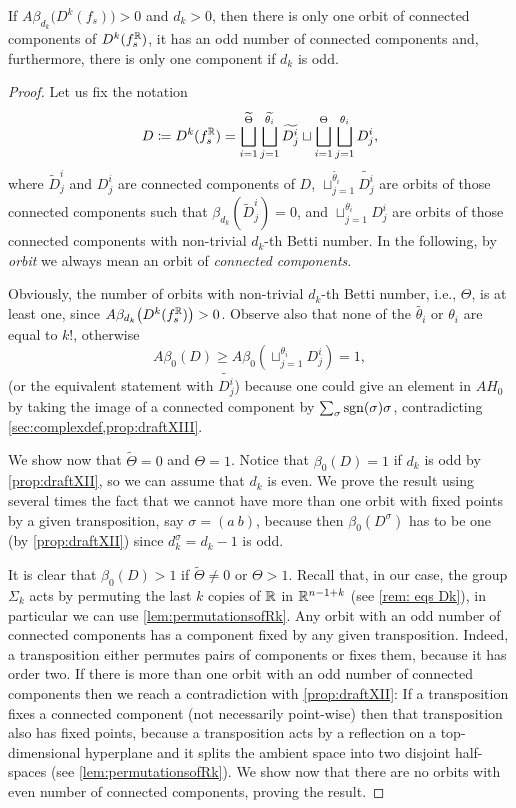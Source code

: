 \documentclass[a4paper,12pt]{amsart}
\begin{document}
\begin{lemma}\label{lem:orbits}
If $A\beta_{d_k}\big(D^k(f_s)\big)>0$ and $d_k>0$, then there is only one orbit of connected components of $D^k(f_s^{\mathbb{R}})$, it has an odd number of connected components and, furthermore, there is only one component if $d_k$ is odd.
\end{lemma}
\begin{proof}
Let us fix the notation
\[ D\coloneqq D^k(f_s^{\mathbb{R}})=\bigsqcup_{i=1}^{\widetilde{\Theta}} \bigsqcup_{j=1}^{\widetilde{\theta_i}} \widetilde{D^i_j} \sqcup \bigsqcup_{i=1}^\Theta \bigsqcup_{j=1}^{\theta_i} D^i_j,\]
where $\widetilde{D}_j^i$ and $D^i_j$ are connected components of $D$, $\sqcup_{j=1}^{\widetilde{\theta_i}} \widetilde{D^i_j}$ are orbits of those connected components such that $\beta_{d_k}(\widetilde{D}_j^i)=0$, and $\sqcup_{j=1}^{\theta_i} D^i_j$ are orbits of those connected components with non-trivial $d_k$-th Betti number. In the following, by \textit{orbit} we always mean an orbit of \emph{connected components}.

Obviously, the number of orbits with non-trivial $d_k$-th Betti number, i.e., $\Theta$, is at least one, since $A\beta_{d_k}\big(D^k(f_s^{\mathbb{R}})\big)>0$. Observe also that none of the $\widetilde{\theta_i}$ or $\theta_i$ are equal to $k!$, otherwise
\[ A\beta_0(D)\geq A\beta_0 \left(\sqcup_{j=1}^{\theta_i} D^i_j\right)=1,\]
(or the equivalent statement with $\widetilde{D^i_j}$) because one could give an element in $AH_0$ by taking the image of a connected component by $\sum_\sigma\operatorname{sgn}(\sigma)\sigma$, contradicting \cref{sec:complexdef,prop:draftXIII}.
\newline

We show now that $\widetilde{\Theta}=0$ and $\Theta=1$. Notice that $\beta_0(D)=1$ if $d_k$ is odd by \cref{prop:draftXII}, so we can assume that $d_k$ is even. We prove the result using several times the fact that we cannot have more than one orbit with fixed points by a given transposition, say $\sigma=(a\ b)$, because then  $\beta_0(D^\sigma)$ has to be one (by \cref{prop:draftXII}) since $d_k^\sigma=d_k-1$ is odd. 


It is clear that $\beta_0(D)>1$ if $\widetilde{\Theta}\neq0$ or $\Theta>1$. Recall that, in our case, the group $\Sigma_k$ acts by permuting the last $k$ copies of  $\mathbb{R}$ in $\mathbb{R}^{n-1+k}$ (see \cref{rem: eqs Dk}), in particular we can use \cref{lem:permutationsofRk}. Any orbit with an odd number of connected components has a component fixed by any given transposition. Indeed, a transposition either permutes pairs of components or fixes them, because it has order two. If there is more than one orbit with an odd number of connected components then we reach a contradiction with \cref{prop:draftXII}: If a transposition fixes a connected component (not necessarily point-wise) then that transposition also has fixed points, because a transposition acts by a reflection on a top-dimensional hyperplane and it splits the ambient space into two disjoint half-spaces (see \cref{lem:permutationsofRk}).  We show now that there are no orbits with even number of connected components, proving the result.



\end{proof}
\end{document}
